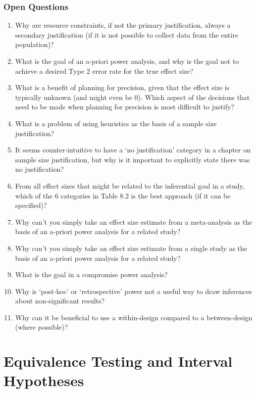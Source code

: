 \documentclass[
  oneside]{krantz}
\begin{document}
\hypertarget{open-questions-6}{%
\subsection{Open Questions}\label{open-questions-6}}

\begin{enumerate}
\def\labelenumi{\arabic{enumi}.}
\item
  Why are resource constraints, if not the primary justification, always a secondary justification (if it is not possible to collect data from the entire population)?
\item
  What is the goal of an a-priori power analysis, and why is the goal not to achieve a desired Type 2 error rate for the true effect size?
\item
  What is a benefit of planning for precision, given that the effect size is typically unknown (and might even be 0). Which aspect of the decisions that need to be made when planning for precision is most difficult to justify?
\item
  What is a problem of using heuristics as the basis of a sample size justification?
\item
  It seems counter-intuitive to have a `no justification' category in a chapter on sample size justification, but why is it important to explicitly state there was no justification?
\item
  From all effect sizes that might be related to the inferential goal in a study, which of the 6 categories in Table 8.2 is the best approach (if it can be specified)?
\item
  Why can't you simply take an effect size estimate from a meta-analysis as the basis of an a-priori power analysis for a related study?
\item
  Why can't you simply take an effect size estimate from a single study as the basis of an a-priori power analysis for a related study?
\item
  What is the goal in a compromise power analysis?
\item
  Why is `post-hoc' or `retrospective' power not a useful way to draw inferences about non-significant results?
\item
  Why can it be beneficial to use a within-design compared to a between-design (where possible)?
\end{enumerate}

\hypertarget{equivalencetest}{%
\chapter{Equivalence Testing and Interval Hypotheses}\label{equivalencetest}}
\end{document}
